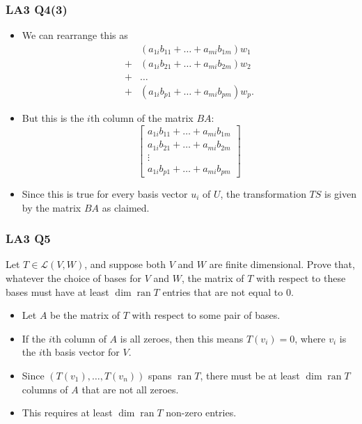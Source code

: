\documentclass[handout]{beamer}
\newcommand{\cL}{\mathcal{L}}
\DeclareMathOperator{\ran}{\mathrm{ran}}
\begin{document}
\begin{frame}
\frametitle{LA3 Q4(3)}
\begin{itemize}
\item We can rearrange this as
\begin{align*}&(a_{1i}b_{11} + \ldots + a_{mi}b_{1m})w_1\\
+&(a_{1i}b_{21} + \ldots + a_{mi}b_{2m})w_2\\ 
+& \ldots\\
+&(a_{1i}b_{p1}+\ldots +a_{mi}b_{pm})w_p.\end{align*}

\item But this is the $i$th column of the matrix $BA$: 
\[\begin{bmatrix}
a_{1i}b_{11} + \ldots + a_{mi}b_{1m}\\
a_{1i}b_{21} + \ldots + a_{mi}b_{2m}\\
\vdots\\
a_{1i}b_{p1}+\ldots +a_{mi}b_{pm}
\end{bmatrix}
\]

\item Since this is true for every basis vector $u_i$ of $U$, the transformation $TS$ is given by the matrix $BA$ as claimed.
\end{itemize}
\end{frame}

\begin{frame}
\frametitle{LA3 Q5}
Let $T\in\cL(V,W)$, and suppose both $V$ and $W$ are finite dimensional. Prove that, whatever the choice of bases for $V$ and $W$, the matrix of $T$ with respect to these bases must have at least $\dim \ran T$ entries that are not equal to $0$.\vspace{0.5cm}
\begin{itemize}
\item Let $A$ be the matrix of $T$ with respect to some pair of bases. \vspace{0.2cm}
\item If the $i$th column of $A$ is all zeroes, then this means $T(v_i)=0$, where $v_i$ is the $i$th basis vector for $V$. \vspace{0.2cm}
\item Since $(T(v_1),\ldots,T(v_n))$ spans $\ran T$, there must be at least $\dim\ran T$ columns of $A$ that are not all zeroes. \vspace{0.2cm}
\item This requires at least $\dim\ran T$ non-zero entries.
\end{itemize}
\end{frame}
\end{document}
